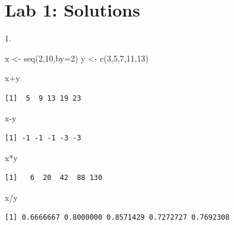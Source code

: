 \documentclass[
  letterpaper,
  DIV=11,
  numbers=noendperiod]{scrreprt}
\newenvironment{Shaded}{\begin{snugshade}}{\end{snugshade}}
\newcommand{\AttributeTok}[1]{\textcolor[rgb]{0.40,0.45,0.13}{#1}}
\newcommand{\DecValTok}[1]{\textcolor[rgb]{0.68,0.00,0.00}{#1}}
\newcommand{\FunctionTok}[1]{\textcolor[rgb]{0.28,0.35,0.67}{#1}}
\newcommand{\NormalTok}[1]{\textcolor[rgb]{0.00,0.23,0.31}{#1}}
\newcommand{\OtherTok}[1]{\textcolor[rgb]{0.00,0.23,0.31}{#1}}
\newcommand{\SpecialCharTok}[1]{\textcolor[rgb]{0.37,0.37,0.37}{#1}}
\begin{document}
\section{Lab 1: Solutions}\label{lab-1-solutions}

1.

\begin{Shaded}
\begin{Highlighting}[]
\NormalTok{x }\OtherTok{\textless{}{-}} \FunctionTok{seq}\NormalTok{(}\DecValTok{2}\NormalTok{,}\DecValTok{10}\NormalTok{,}\AttributeTok{by=}\DecValTok{2}\NormalTok{)}
\NormalTok{y }\OtherTok{\textless{}{-}} \FunctionTok{c}\NormalTok{(}\DecValTok{3}\NormalTok{,}\DecValTok{5}\NormalTok{,}\DecValTok{7}\NormalTok{,}\DecValTok{11}\NormalTok{,}\DecValTok{13}\NormalTok{)}

\NormalTok{x}\SpecialCharTok{+}\NormalTok{y}
\end{Highlighting}
\end{Shaded}

\begin{verbatim}
[1]  5  9 13 19 23
\end{verbatim}

\begin{Shaded}
\begin{Highlighting}[]
\NormalTok{x}\SpecialCharTok{{-}}\NormalTok{y}
\end{Highlighting}
\end{Shaded}

\begin{verbatim}
[1] -1 -1 -1 -3 -3
\end{verbatim}

\begin{Shaded}
\begin{Highlighting}[]
\NormalTok{x}\SpecialCharTok{*}\NormalTok{y}
\end{Highlighting}
\end{Shaded}

\begin{verbatim}
[1]   6  20  42  88 130
\end{verbatim}

\begin{Shaded}
\begin{Highlighting}[]
\NormalTok{x}\SpecialCharTok{/}\NormalTok{y}
\end{Highlighting}
\end{Shaded}

\begin{verbatim}
[1] 0.6666667 0.8000000 0.8571429 0.7272727 0.7692308
\end{verbatim}
\end{document}
